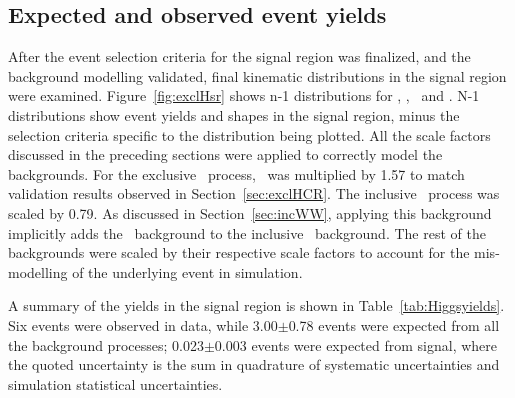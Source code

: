 \subsection{Expected and observed event yields}
\par After the event selection criteria for the signal region was finalized, and the background 
modelling validated, final kinematic distributions in the signal region were examined. 
Figure~\ref{fig:exclHsr} shows n-1 distributions for \dFem, \memu, \mT\ and \pTemu. 
N-1 distributions show event yields and shapes in the signal region, minus the 
selection criteria specific to the distribution being plotted. All the scale factors 
discussed in the preceding sections were applied to correctly model the backgrounds. 
For the exclusive \WW\ process, \fgam\ was multiplied by 1.57 to match validation 
results observed in Section~\ref{sec:exclHCR}. The inclusive \WW\ process was scaled 
by 0.79. As discussed in Section~\ref{sec:incWW}, applying this background implicitly 
adds the \Ztau\ background to the inclusive \WW\ background. The rest of the backgrounds 
were scaled by their respective scale factors to account for the mis-modelling of the 
underlying event in simulation.

\par A summary of the yields in the signal region is shown in Table~\ref{tab:Higgsyields}.    
Six events were observed in data, while 3.00$\pm$0.78 events were expected from all 
the background processes; 0.023$\pm$0.003 events were expected from signal, where the 
quoted uncertainty is the sum in quadrature of systematic uncertainties and simulation 
statistical uncertainties. 


